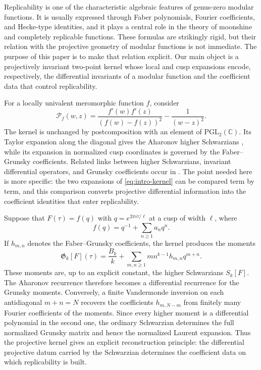 \documentclass[11pt]{amsart}
\theoremstyle{definition}
\theoremstyle{remark}
\numberwithin{equation}{section}
\begin{document}
Replicability is one of the characteristic algebraic features of genus-zero modular functions. It is usually expressed through Faber polynomials, Fourier coefficients, and Hecke-type identities, and it plays a central role in the theory of moonshine and completely replicable functions. These formulas are strikingly rigid, but their relation with the projective geometry of modular functions is not immediate. The purpose of this paper is to make that relation explicit. Our main object is a projectively invariant two-point kernel whose local and cusp expansions encode, respectively, the differential invariants of a modular function and the coefficient data that control replicability.

For a locally univalent meromorphic function $f$, consider
\begin{equation}\label{eq:intro-kernel}
\mathcal P_f(w,z)
=
\frac{f'(w)f'(z)}{(f(w)-f(z))^2}-\frac1{(w-z)^2}.
\end{equation}
The kernel is unchanged by postcomposition with an element of $\mathrm{PGL}_2(\mathbb C)$. Its Taylor expansion along the diagonal gives the Aharonov higher Schwarzians \cite{aharonov}, while its expansion in normalized cusp coordinates is governed by the Faber--Grunsky coefficients. Related links between higher Schwarzians, invariant differential operators, and Grunsky coefficients occur in \cite{harmelin,harmelin-derivatives,harmelin-grunsky,schippers,kim-sugawa,tamanoi}. The point needed here is more specific: the two expansions of \eqref{eq:intro-kernel} can be compared term by term, and this comparison converts projective differential information into the coefficient identities that enter replicability.

Suppose that $F(\tau)=f(q)$ with $q=e^{2\pi i\tau/\ell}$ at a cusp of width $\ell$, where
\[
f(q)=q^{-1}+\sum_{n\geq1}a_nq^n.
\]
If $h_{m,n}$ denotes the Faber--Grunsky coefficients, the kernel produces the moments
\[
\mathfrak G_k[F](\tau)
=
\frac{B_k}{k}
+
\sum_{m,n\geq1}m n^{k-1}h_{m,n}q^{m+n}.
\]
These moments are, up to an explicit constant, the higher Schwarzians $S_k[F]$. The Aharonov recurrence therefore becomes a differential recurrence for the Grunsky moments. Conversely, a finite Vandermonde inversion on each antidiagonal $m+n=N$ recovers the coefficients $h_{m,N-m}$ from finitely many Fourier coefficients of the moments. Since every higher moment is a differential polynomial in the second one, the ordinary Schwarzian determines the full normalized Grunsky matrix and hence the normalized Laurent expansion. Thus the projective kernel gives an explicit reconstruction principle: the differential projective datum carried by the Schwarzian determines the coefficient data on which replicability is built.
\end{document}
